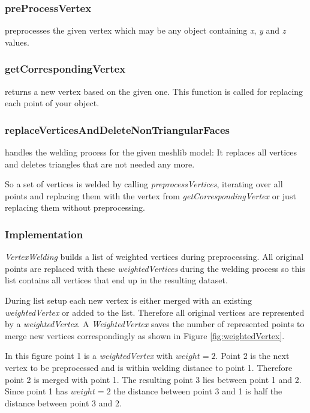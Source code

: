 \documentclass[../ClassicThesis.tex]{subfiles}
\begin{document}
\subsubsection*{preProcessVertex}

preprocesses the given vertex which may be any object containing \emph{x}, \emph{y} and \emph{z} values.

\subsubsection*{getCorrespondingVertex}

returns a new vertex based on the given one. This function is called for replacing each point of your object.

\subsubsection*{replaceVerticesAndDeleteNonTriangularFaces}

handles the welding process for the given meshlib model: It replaces all vertices and deletes triangles that are not needed any more.


So a set of vertices is welded by calling \emph{preprocessVertices}, iterating over all points and replacing them with the vertex from \emph{getCorrespondingVertex} or just replacing them without preprocessing.


\subsubsection{Implementation}

\emph{VertexWelding} builds a list of weighted vertices during preprocessing. All original points are replaced with these \emph{weightedVertices} during the welding process so this list contains all vertices that end up in the resulting dataset.

During list setup each new vertex is either merged with an existing \emph{weightedVertex} or added to the list. Therefore all original vertices are represented by a \emph{weightedVertex}. A \emph{WeightedVertex} saves the number of represented points to merge new vertices correspondingly as shown in Figure \ref{fig:weightedVertex}.

In this figure point 1 is a \emph{weightedVertex} with $weight = 2 $. Point 2 is the next vertex to be preprocessed and is within welding distance to point 1. Therefore point 2 is merged with point 1. The resulting point 3 lies between point 1 and 2. Since point 1 has $ weight = 2 $ the distance between point 3 and 1 is half the distance between point 3 and 2.
\end{document}
